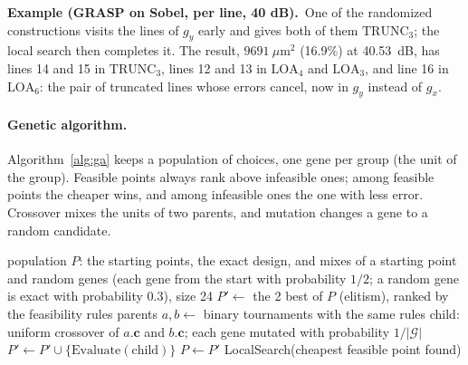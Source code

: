 \documentclass[11pt,a4paper]{article}
\newcommand{\examplebox}[2]{\par\medskip\noindent\colorbox{tabAzul!6}{\begin{minipage}{\dimexpr\linewidth-2\fboxsep}
  \textbf{Example (#1).}\ #2\end{minipage}}\par\medskip}
\begin{document}
\examplebox{GRASP on Sobel, per line, 40 dB}{One of the randomized constructions visits the lines of $g_y$ early and
gives both of them $\text{TRUNC}_3$; the local search then completes it. The result, $9691\ \mu\text{m}^2$ (16.9\%)
at 40.53~dB, has lines 14 and 15 in $\text{TRUNC}_3$, lines 12 and 13 in $\text{LOA}_4$ and $\text{LOA}_3$, and line
16 in $\text{LOA}_6$: the pair of truncated lines whose errors cancel, now in $g_y$ instead of $g_x$.}

\paragraph{Genetic algorithm.} Algorithm~\ref{alg:ga} keeps a population of choices, one gene per group (the unit of
the group). Feasible points always rank above infeasible ones; among feasible points the cheaper wins, and among
infeasible ones the one with less error. Crossover mixes the units of two parents, and mutation changes a gene to a
random candidate.

\begin{algorithm}[H]
\caption{Genetic algorithm}\label{alg:ga}
\begin{algorithmic}[1]
\State population $P$: the starting points, the exact design, and mixes of a starting point and random genes
  (each gene from the start with probability $1/2$; a random gene is exact with probability $0.3$), size 24
  \State $P' \gets$ the 2 best of $P$ (elitism), ranked by the feasibility rules
    \State parents $a, b \gets$ binary tournaments with the same rules
    \State child: uniform crossover of $a.\mathbf{c}$ and $b.\mathbf{c}$; each gene mutated with probability $1/|\mathcal{G}|$
    \State $P' \gets P' \cup \{\text{Evaluate}(\text{child})\}$
  \EndWhile
  \State $P \gets P'$
\EndFor
\State \Return LocalSearch(cheapest feasible point found)
\end{algorithmic}
\end{algorithm}
\end{document}
